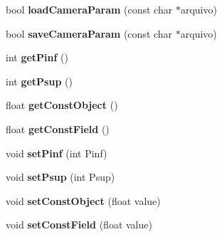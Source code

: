 \begin{DoxyCompactItemize}
\item 
bool {\bfseries load\+Camera\+Param} (const char $\ast$arquivo)\hypertarget{classCalibratorProcessor_a6d4a27d1af55d2b2d91acec63b06627d}{}\label{classCalibratorProcessor_a6d4a27d1af55d2b2d91acec63b06627d}

\item 
bool {\bfseries save\+Camera\+Param} (const char $\ast$arquivo)\hypertarget{classCalibratorProcessor_a534d72247955265dfeb0fc615c89f572}{}\label{classCalibratorProcessor_a534d72247955265dfeb0fc615c89f572}

\item 
int {\bfseries get\+Pinf} ()\hypertarget{classCalibratorProcessor_aa0f670ab924808c82fd19d7e8fe6a24e}{}\label{classCalibratorProcessor_aa0f670ab924808c82fd19d7e8fe6a24e}

\item 
int {\bfseries get\+Psup} ()\hypertarget{classCalibratorProcessor_aeb5115613b67d9a6b4bd08f9c5a15440}{}\label{classCalibratorProcessor_aeb5115613b67d9a6b4bd08f9c5a15440}

\item 
float {\bfseries get\+Const\+Object} ()\hypertarget{classCalibratorProcessor_a8e8dc9b1b8b3260cc7d14f0b3068a60f}{}\label{classCalibratorProcessor_a8e8dc9b1b8b3260cc7d14f0b3068a60f}

\item 
float {\bfseries get\+Const\+Field} ()\hypertarget{classCalibratorProcessor_aa054e70d666b4fa2253436fb3feb8e9e}{}\label{classCalibratorProcessor_aa054e70d666b4fa2253436fb3feb8e9e}

\item 
void {\bfseries set\+Pinf} (int Pinf)\hypertarget{classCalibratorProcessor_a2a6a0e8fa9e3d146126710ef7ca0a8ff}{}\label{classCalibratorProcessor_a2a6a0e8fa9e3d146126710ef7ca0a8ff}

\item 
void {\bfseries set\+Psup} (int Psup)\hypertarget{classCalibratorProcessor_a1a366f81ceefb2ef74833aa176fe6a6f}{}\label{classCalibratorProcessor_a1a366f81ceefb2ef74833aa176fe6a6f}

\item 
void {\bfseries set\+Const\+Object} (float value)\hypertarget{classCalibratorProcessor_aecfcc16844ddd8dde596f6591e1e4439}{}\label{classCalibratorProcessor_aecfcc16844ddd8dde596f6591e1e4439}

\item 
void {\bfseries set\+Const\+Field} (float value)\hypertarget{classCalibratorProcessor_aa84de9e703800d9b90a2c9ad3186d6e0}{}\label{classCalibratorProcessor_aa84de9e703800d9b90a2c9ad3186d6e0}


\end{DoxyCompactItemize}
